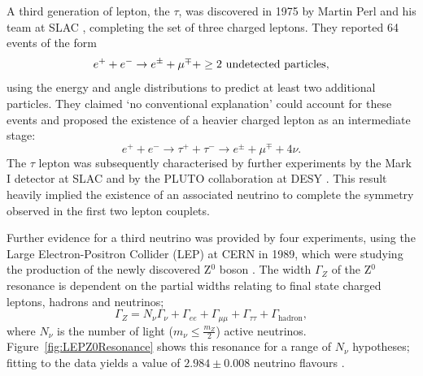 A third generation of lepton, the $\tau$, was discovered in 1975 by Martin Perl and his team at SLAC \cite{Perl1975}, completing the set of three charged leptons.  They reported 64 events of the form
\begin{equation}
  e^+ + e^- \rightarrow e^{\pm} + \mu^{\mp} + \ge 2 \textnormal{ undetected particles},
\end{equation}
using the energy and angle distributions to predict at least two additional particles.  They claimed `no conventional explanation' could account for these events and proposed the existence of a heavier charged lepton as an intermediate stage:
\begin{equation}
  e^+ + e^- \rightarrow \tau^+ + \tau^- \rightarrow e^{\pm} + \mu^{\mp} + 4\nu.
\end{equation}
The $\tau$ lepton was subsequently characterised by further experiments by the Mark I detector at SLAC \cite{Feldman1977} and by the PLUTO collaboration at DESY \cite{Burmester1977}.  This result heavily implied the existence of an associated neutrino to complete the symmetry observed in the first two lepton couplets.

Further evidence for a third neutrino was provided by four experiments, using the Large Electron-Positron Collider (LEP) at CERN in 1989, which were studying the production of the newly discovered Z$^0$ boson \cite{DeCamp1989,Adeva1989,Akrawy1989,Aarnio1989}.  The width $\Gamma_Z$ of the Z$^0$ resonance is dependent on the partial widths relating to final state charged leptons, hadrons and neutrinos;
\begin{equation}
  \Gamma_Z = N_{\nu} \Gamma_{\nu} + \Gamma_{ee} + \Gamma_{\mu\mu} + \Gamma_{\tau\tau} + \Gamma_{\mathrm{hadron}},
\end{equation}
where $N_{\nu}$ is the number of light ($m_{\nu} \le \frac{m_Z}{2}$) active neutrinos.  Figure~\ref{fig:LEPZ0Resonance} shows this resonance for a range of $N_{\nu}$ hypotheses; fitting to the data yields a value of $2.984 \pm 0.008$ neutrino flavours \cite{Schael2006}.

